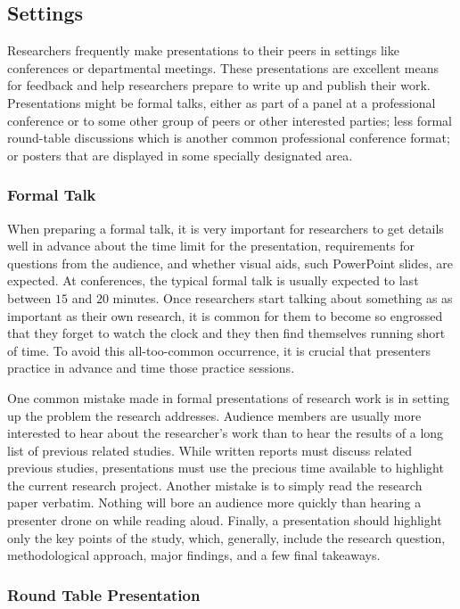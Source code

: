 \subsection{Settings}

Researchers frequently make presentations to their peers in settings like conferences or departmental meetings. These presentations are excellent means for feedback and help researchers prepare to write up and publish their work. Presentations might be formal talks, either as part of a panel at a professional conference or to some other group of peers or other interested parties; less formal round-table discussions which is another common professional conference format; or posters that are displayed in some specially designated area.

\subsubsection{Formal Talk}

When preparing a formal talk, it is very important for researchers to get details well in advance about the time limit for the presentation, requirements for questions from the audience, and whether visual aids, such PowerPoint slides, are expected. At conferences, the typical formal talk is usually expected to last between $ 15 $ and $ 20 $ minutes. Once researchers start talking about something as as important as their own research, it is common for them to become so engrossed that they forget to watch the clock and they then find themselves running short of time. To avoid this all-too-common occurrence, it is crucial that presenters practice in advance and time those practice sessions.

One common mistake made in formal presentations of research work is in setting up the problem the research addresses. Audience members are usually more interested to hear about the researcher's work than to hear the results of a long list of previous related studies. While written reports must discuss related previous studies, presentations must use the precious time available to highlight the current research project. Another mistake is to simply read the research paper verbatim. Nothing will bore an audience more quickly than hearing a presenter drone on while reading aloud. Finally, a presentation should highlight only the key points of the study, which, generally, include the research question, methodological approach, major findings, and a few final takeaways.

\subsubsection{Round Table Presentation}

